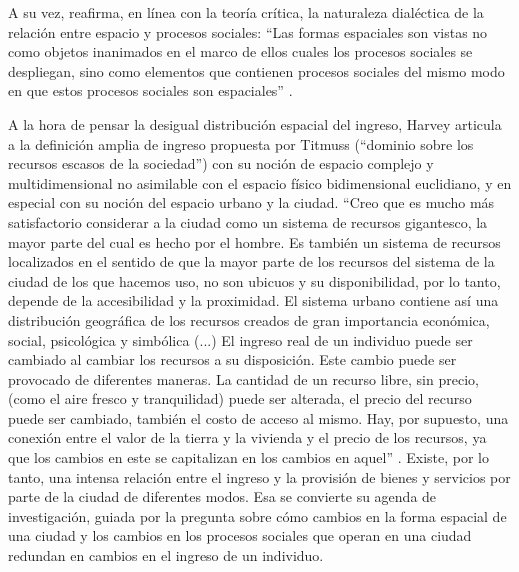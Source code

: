 A su vez, reafirma, en línea con la teoría crítica, la naturaleza dialéctica de la relación entre espacio y procesos sociales:  “Las formas espaciales son vistas no como objetos inanimados en el marco de ellos cuales los procesos sociales se despliegan, sino como elementos que contienen procesos sociales del mismo modo en que estos procesos sociales son espaciales” \cite[~3]{harvey}.



A la hora de pensar la desigual distribución espacial del ingreso, Harvey articula a la definición amplia de ingreso propuesta por Titmuss (“dominio sobre los recursos escasos de la sociedad”) con su noción de espacio complejo y multidimensional no asimilable con el espacio físico bidimensional euclidiano, y en especial con su noción del espacio urbano y la ciudad. “Creo que es mucho más satisfactorio considerar a la ciudad como un sistema de recursos gigantesco, la mayor parte del cual es hecho por el hombre. Es también un sistema de recursos localizados en el sentido de que la mayor parte de los recursos del sistema de la ciudad de los que hacemos uso, no son ubicuos y su disponibilidad, por lo tanto, depende de la accesibilidad y la proximidad. El sistema urbano contiene así una distribución geográfica de los recursos creados de gran importancia económica, social, psicológica y simbólica (...) El ingreso real de un individuo puede ser cambiado al cambiar los recursos a su disposición. Este cambio puede ser provocado de diferentes maneras. La cantidad de un recurso libre, sin precio, (como el aire fresco y tranquilidad) puede ser alterada, el precio del recurso puede ser cambiado, también el costo de acceso al mismo. Hay, por supuesto, una conexión entre el valor de la tierra y la vivienda y el precio de los recursos, ya que los cambios en este se capitalizan en los cambios en aquel” \cite[p.~68]{harvey}. Existe, por lo tanto, una intensa relación entre el ingreso y la provisión de bienes y servicios por parte de la ciudad de diferentes modos. Esa se convierte su agenda de investigación, guiada por la pregunta sobre cómo cambios en la forma espacial de una ciudad y los cambios en los procesos sociales que operan en una ciudad redundan en cambios en el ingreso de un individuo. 

